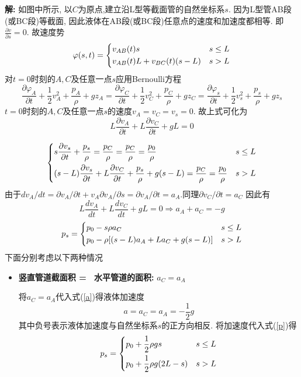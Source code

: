 \begin{solution}
\textbf{解:}
如图中所示, 以$C$为原点,建立沿L型等截面管的自然坐标系$s$. 因为L型管AB段(或BC段)等截面, 因此液体在AB段(或BC段)任意点的速度和加速度都相等. 即$\frac{\partial v}{\partial s} = 0$. 故速度势
\[
\varphi(s,t) =\begin{dcases}
 v_{AB}(t)s & s \leq L \\
v_{AB}(t)L + v_{BC}(t)(s-L) & s > L
\end{dcases}
\]
对$t=0$时刻的$A,C$及任意一点$s$应用Bernoulli方程
\begin{equation}
\frac{\partial\varphi_A}{\partial t} + \frac{1}{2}v_A^2 + \frac{p_A}{\rho} + gz_A = \frac{\partial\varphi_C}{\partial t} + \frac{1}{2}v_C^2 + \frac{p_C}{\rho} + gz_C =
\frac{\partial\varphi_s}{\partial t} + \frac{1}{2}v_s^2 + \frac{p_s}{\rho} + gz_s
\end{equation}
$t=0$时刻的$A,C$及任意一点$s$的速度$v_A = v_C = v_s=0$. 故上式可化为
\[
L\frac{\partial v_A}{\partial t} + L\frac{\partial v_C}{\partial t} + gL = 0
\]

\[
\begin{dcases}
 s\frac{\partial v_s}{\partial t} + \frac{p_s}{\rho} = \frac{p_C}{\rho} = \frac{p_C}{\rho}=\frac{p_0}{\rho} & s \leq L \\
 (s-L)\frac{\partial v_s}{\partial t} + L\frac{\partial v_C}{\partial t} + \frac{p_s}{\rho} + g(s-L) =  \frac{p_C}{\rho} = \frac{p_0}{\rho} & s > L
\end{dcases}
\]
由于$dv_A/dt=\partial v_A/\partial t + v_A \partial v_A/\partial s = \partial v_A/\partial t = a_A$.同理$\partial v_C/\partial t = a_C$ 因此有
\begin{equation}\label{a}
L\frac{d v_A}{d t} + L\frac{d v_C}{d t} + gL = 0 \Longrightarrow a_A + a_C = -g
\end{equation}
\begin{equation}\label{p}
p_s = \begin{dcases}
p_0 - s\rho a_C & s \leq L \\
p_0 - \rho[(s-L)a_A + La_C + g(s-L)]& s > L
\end{dcases}
\end{equation}
下面分别考虑以下两种情况
\begin{itemize}
\item \textbf{竖直管道截面积 = \textcolor{white}{2}水平管道的面积:} $a_C = a_A$

将$a_C = a_A$代入式(\ref{a})得液体加速度
\[
a = a_C = a_A = - \frac{1}{2}g
\]
其中负号表示液体加速度与自然坐标系$s$的正方向相反. 将加速度代入式(\ref{p})得
\[
p_s = 
\begin{dcases}
p_0 + \frac{1}{2}\rho gs & s \leq L \\
p_0 + \frac{1}{2}\rho g(2L-s) & s > L
\end{dcases}
\]


\end{itemize}
\end{solution}
